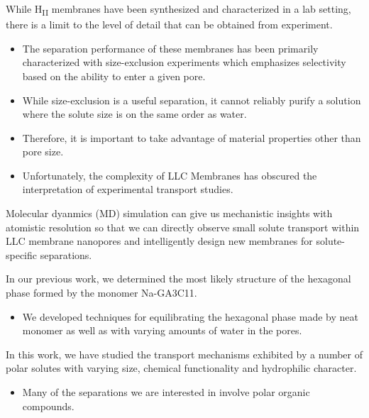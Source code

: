 \documentclass{article}
\begin{document}
  While H\textsubscript{II} membranes have been synthesized and characterized
  in a lab setting, there is a limit to the level of detail that can be obtained 
  from experiment. 
  \begin{itemize}
  	\item The separation performance of these membranes has been primarily 
  	characterized with size-exclusion experiments which emphasizes selectivity
  	based on the ability to enter a given pore. 
  	\item While size-exclusion is a useful separation, it cannot 
  	reliably purify a solution where the solute size is on the same order as water.
  	\item Therefore, it is important to take advantage of material properties other
  	than pore size.
  	\item Unfortunately, the complexity of LLC Membranes has obscured the interpretation 
  	of experimental transport studies.
  \end{itemize}
  
  Molecular dyanmics (MD) simulation can give us mechanistic insights with atomistic
  resolution so that we can directly observe small solute transport within LLC membrane
  nanopores and intelligently design new membranes for solute-specific separations.

  In our previous work, we determined the most likely structure of the hexagonal phase 
  formed by the monomer Na-GA3C11.
  \begin{itemize}
  	\item We developed techniques for equilibrating the hexagonal phase made by
	neat monomer as well as with varying amounts of water in the pores.
  \end{itemize} 

  In this work, we have studied the transport mechanisms exhibited by a number
  of polar solutes with varying size, chemical functionality and hydrophilic character.
  \begin{itemize}
	\item Many of the separations we are interested in involve polar organic 
	compounds.
  \end{itemize} 
  
\end{document}
